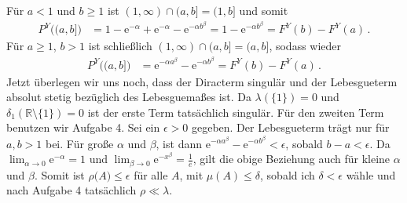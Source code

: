 \documentclass{article}
\begin{document}
Für $a<1$ und $b\geq1$ ist $(1,\infty)\cap(a,b]=(1,b]$ und somit
\begin{align*}
  P^Y\bigl((a,b]\bigr)
  &=1-\mathrm{e}^{-\alpha}+\mathrm{e}^{-\alpha}-\mathrm{e}^{-\alpha b^\beta}=1-\mathrm{e}^{-\alpha b^\beta}=F^Y(b)-F^Y(a)\,.
\end{align*}
Für $a\geq1$, $b>1$ ist schließlich $(1,\infty)\cap(a,b]=(a,b]$, sodass wieder
\begin{align*}
  P^Y\bigl((a,b]\bigr)
  &=\mathrm{e}^{-\alpha a^\beta}-\mathrm{e}^{-\alpha b^\beta}=F^Y(b)-F^Y(a)\,.
\end{align*}
Jetzt überlegen wir uns noch, dass der Diracterm singulär und der Lebesgueterm absolut stetig bezüglich des Lebesguemaßes ist.
Da $\lambda(\{1\})=0$ und $\delta_1(\mathbb{R}\setminus\{1\})=0$ ist der erste Term tatsächlich singulär.
Für den zweiten Term benutzen wir Aufgabe 4.
Sei ein $\epsilon>0$ gegeben.
Der Lebesgueterm trägt nur für $a,b>1$ bei.
Für große $\alpha$ und $\beta$, ist dann $\mathrm{e}^{-\alpha a^\beta}-\mathrm{e}^{-\alpha b^\beta}<\epsilon$, sobald $b-a<\epsilon$.
Da $\lim_{\alpha\to0}\mathrm{e}^{-\alpha}=1$ und $\lim_{\beta\to 0}\mathrm{e}^{-x^\beta}=\frac{1}{e}$, gilt die obige Beziehung auch für kleine $\alpha$ und $\beta$. Somit ist $\rho\bigl(A\bigr)\leq\epsilon$ für alle $A$, mit $\mu(A)\leq \delta$, sobald ich $\delta<\epsilon$ wähle und nach Aufgabe 4 tatsächlich $\rho\ll\lambda$.
\end{document}
